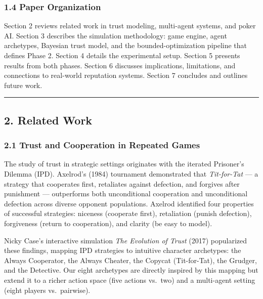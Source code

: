 \documentclass[
]{article}
\begin{document}
\hypertarget{paper-organization}{%
\subsubsection{1.4 Paper Organization}\label{paper-organization}}

Section 2 reviews related work in trust modeling, multi-agent systems,
and poker AI. Section 3 describes the simulation methodology: game
engine, agent archetypes, Bayesian trust model, and the
bounded-optimization pipeline that defines Phase 2. Section 4 details
the experimental setup. Section 5 presents results from both phases.
Section 6 discusses implications, limitations, and connections to
real-world reputation systems. Section 7 concludes and outlines future
work.

\begin{center}\rule{0.5\linewidth}{0.5pt}\end{center}

\hypertarget{related-work}{%
\subsection{2. Related Work}\label{related-work}}

\hypertarget{trust-and-cooperation-in-repeated-games}{%
\subsubsection{2.1 Trust and Cooperation in Repeated
Games}\label{trust-and-cooperation-in-repeated-games}}

The study of trust in strategic settings originates with the iterated
Prisoner's Dilemma (IPD). Axelrod's (1984) tournament demonstrated that
\emph{Tit-for-Tat} --- a strategy that cooperates first, retaliates
against defection, and forgives after punishment --- outperforms both
unconditional cooperation and unconditional defection across diverse
opponent populations. Axelrod identified four properties of successful
strategies: niceness (cooperate first), retaliation (punish defection),
forgiveness (return to cooperation), and clarity (be easy to model).

Nicky Case's interactive simulation \emph{The Evolution of Trust} (2017)
popularized these findings, mapping IPD strategies to intuitive
character archetypes: the Always Cooperator, the Always Cheater, the
Copycat (Tit-for-Tat), the Grudger, and the Detective. Our eight
archetypes are directly inspired by this mapping but extend it to a
richer action space (five actions vs.~two) and a multi-agent setting
(eight players vs.~pairwise).
\end{document}
